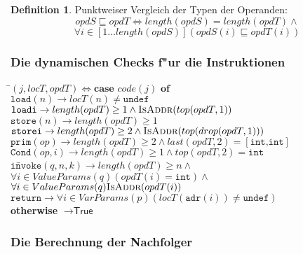 \documentclass[german,10pt, a4paper, twocolumn]{scrartcl}
\theoremstyle{definition}
\newtheorem{definition}{Definition}[section]
\theoremstyle{remark}
\begin{document}
\begin{definition}
	Punktweiser Vergleich der Typen der Operanden:
	\begin{displaymath}
		opdS \sqsubseteq opdT \Leftrightarrow length(opdS) = length(opdT) \land
	\end{displaymath}
	\begin{displaymath}
		\forall i \in [1\ldots length(opdS)](opdS(i)\sqsubseteq opdT(i))
	\end{displaymath}
\end{definition}

\subsubsection{Die dynamischen Checks f"ur die Instruktionen}

\small
\begin{tabbing}
 \=$(j,locT,opdT) \Leftrightarrow \textbf{case } code(j) \textbf{ of}$\\
 \>	$\texttt{load}(n) \rightarrow locT(n) \neq \texttt{undef}$\\
 \>	$\texttt{loadi} \rightarrow length(opdT) \geq 1 \land \textsc{IsAddr}(top(opdT,1))$\\
 \>	$\texttt{store}(n) \rightarrow length(opdT)\geq 1$\\
 \>	$\texttt{storei} \rightarrow length(opdT)\geq 2 \land \textsc{IsAddr}(top(drop(opdT,1)))$\\
 \>	$\texttt{prim}(op) \rightarrow length(opdT) \geq 2 \land last(opdT,2) = [\texttt{int,int}]$\\
 \>	$\texttt{Cond}(op,i) \rightarrow length(opdT) \geq 1 \land top(opdT,2) = \texttt{int}$\\
 \>	$\texttt{in}$\=$\texttt{voke}(q,n,k) \rightarrow length(opdT) \geq n \land$\\
 \>	\>	$\forall i \in ValueParams(q)(opdT(i) = \texttt{int})\land$\\
 \>	\>	$\forall i \in ValueParams(q)\textsc{IsAddr}(opdT(i))$\\
 \>	$\texttt{return} \rightarrow \forall i \in VarParams(p)(locT(\texttt{adr}(i)) \neq \texttt{undef})$\\
 \>	\textbf{otherwise} $\rightarrow \textsf{True}$
\end{tabbing}
\normalsize

\subsubsection{Die Berechnung der Nachfolger}
\end{document}
